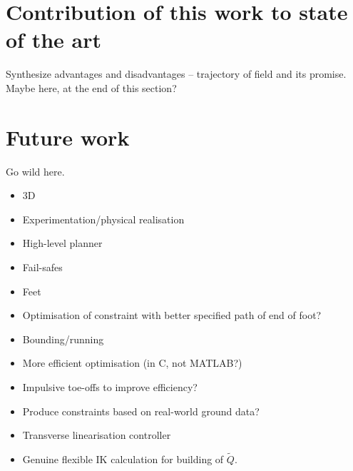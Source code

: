 \section{Contribution of this work to state of the art}
Synthesize advantages and disadvantages -- trajectory of field and its promise. Maybe here, at the end of this section?

\section{Future work}
Go wild here.

\begin{itemize}
	\item 3D
	\item Experimentation/physical realisation
	\item High-level planner
	\item Fail-safes
	\item Feet
	\item Optimisation of constraint with better specified path of end of foot?
	\item Bounding/running
	\item More efficient optimisation (in C, not MATLAB?)
	\item Impulsive toe-offs to improve efficiency?
	\item Produce constraints based on real-world ground data?
	\item Transverse linearisation controller
	\item Genuine flexible IK calculation for building of $\tilde{Q}$.
\end{itemize}